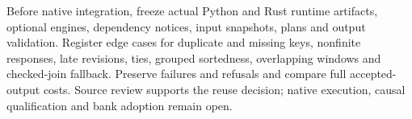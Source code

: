 Before native integration, freeze actual Python and Rust runtime
artifacts, optional engines, dependency notices, input snapshots, plans
and output validation. Register edge cases for duplicate and missing
keys, nonfinite responses, late revisions, ties, grouped sortedness,
overlapping windows and checked-join fallback. Preserve failures and
refusals and compare full accepted-output costs. Source review supports
the reuse decision; native execution, causal qualification and bank
adoption remain open.
